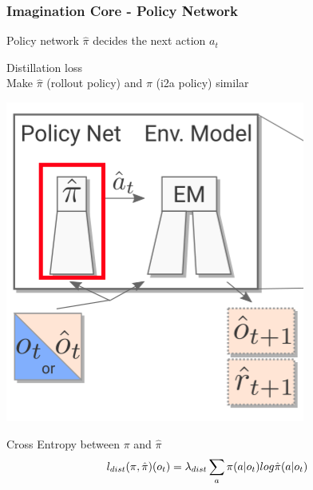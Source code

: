 \begin{frame}
    \frametitle{Imagination Core - Policy Network}

\begin{multicols}{2}
	\begin{PraesentationAufzaehlung}
	    \item Policy network $\hat{\pi}$ decides the next action $a_t$
		\item Distillation loss\\
		Make $\hat{\pi}$ (rollout policy) and $\pi$ (i2a policy) similar\\
	\end{PraesentationAufzaehlung}
    \vfill\columnbreak
	\begin{center}
    \includegraphics[height=0.35\textheight]{./Images/policy_net.png}%
	\end{center}
\end{multicols}
\begin{PraesentationAufzaehlung}	    
	\item Cross Entropy between $\pi$ and $\hat{\pi}$\\
	\begin{equation}
		\mathnormal{
		l_{dist}(\pi, \hat{\pi})(o_t) = \lambda_{dist} \sum_a \pi(a | o_t) log \hat{\pi}(a|o_t)
		}
	\end{equation}
\end{PraesentationAufzaehlung}
    
\end{frame}
\clearpage




